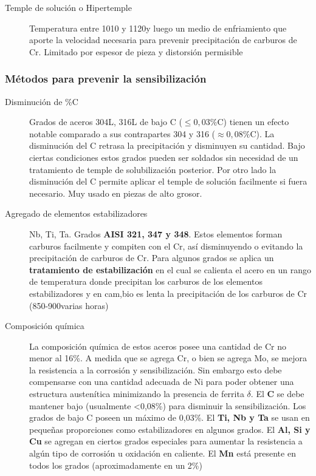 \begin{description}
	\item[Temple de solución o Hipertemple] Temperatura entre 1010 y 1120\grad y luego un medio de enfriamiento que aporte la velocidad necesaria para prevenir precipitación de carburos de Cr. Limitado por espesor de pieza y distorsión permisible
\end{description}


\subsubsection{Métodos para prevenir la sensibilización}

\begin{description}
	\item[Disminución de \%C]  Grados de aceros 304L, 316L de bajo C ($\leq0,03\%$C) tienen un efecto notable comparado a sus contrapartes 304 y 316 ($\approx 0,08\%$C). La disminución del C retrasa la precipitación y disminuyen su cantidad. Bajo ciertas condiciones estos grados pueden ser soldados sin necesidad de un tratamiento de temple de solubilización posterior. Por otro lado la disminución del C permite aplicar el temple de solución facilmente si fuera necesario. Muy usado en piezas de alto grosor. 
	\item[Agregado de elementos estabilizadores] Nb, Ti, Ta. Grados \textbf{AISI 321, 347 y 348}. Estos elementos forman carburos facilmente y compiten con el Cr, así disminuyendo o evitando la precipitación de carburos de Cr. Para algunos grados se aplica un \textbf{tratamiento de estabilización} en el cual se calienta el acero en un rango de temperatura donde precipitan los carburos de los elementos estabilizadores y en cam,bio es lenta la precipitación de los carburos de Cr (850-900\grad varias horas)
	\item[Composición química] La composición química de estos aceros posee una cantidad de Cr no menor al 16\%. A medida que se agrega Cr, o bien se agrega Mo, se mejora la resistencia a la corrosión y sensibilización. Sin embargo esto debe compensarse con una cantidad adecuada de Ni para poder obtener una estructura austenítica minimizando la presencia de ferrita $\delta$. El \textbf{C} se debe mantener bajo (usualmente <0,08\%) para disminuir la sensibilización. Los grados de bajo C poseen un máximo de 0,03\%. El \textbf{Ti, Nb y Ta} se usan en pequeñas proporciones como estabilizadores en algunos grados. El \textbf{Al, Si y Cu} se agregan en ciertos grados especiales para aumentar la resistencia a algún tipo de corrosión u oxidación en caliente. El \textbf{Mn} está presente en todos los grados (aproximadamente en un 2\%)   
\end{description}

